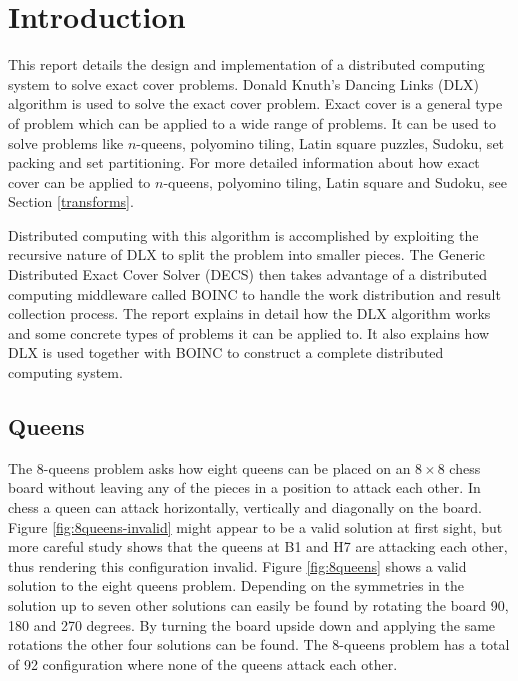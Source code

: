 
\chapter{Introduction}

This report details the design and implementation of a distributed computing system to solve exact cover problems.
Donald Knuth's Dancing Links (DLX) algorithm \cite{knuth00dancing} is used to solve the exact cover problem.
Exact cover is a general type of problem which can be applied to a wide range of problems.
It can be used to solve problems like $n$-queens, polyomino tiling, Latin square puzzles, Sudoku, set packing and set partitioning.
For more detailed information about how exact cover can be applied to $n$-queens, polyomino tiling, Latin square and Sudoku, see Section \ref{transforms}.

Distributed computing with this algorithm is accomplished by exploiting the recursive nature of DLX to split the problem into smaller pieces.
The Generic Distributed Exact Cover Solver (DECS) then takes advantage of a distributed computing middleware called BOINC \cite{boinc} to handle the work distribution and result collection process.
The report explains in detail how the DLX algorithm works and some concrete types of problems it can be applied to.
It also explains how DLX is used together with BOINC to construct a complete distributed computing system.



\section{Queens}

The 8-queens problem asks how eight queens can be placed on an $8 \times 8$ chess board without leaving any of the pieces in a position to attack each other.
In chess a queen can attack horizontally, vertically and diagonally on the board.
Figure \ref{fig:8queens-invalid} might appear to be a valid solution at first sight, but more careful study shows that the queens at B1 and H7 are attacking each other, thus rendering this configuration invalid.
Figure \ref{fig:8queens} shows a valid solution to the eight queens problem.
Depending on the symmetries in the solution up to seven other solutions can easily be found by rotating the board 90, 180 and 270 degrees.
By turning the board upside down and applying the same rotations the other four solutions can be found.
The 8-queens problem has a total of 92 configuration where none of the queens attack each other.

